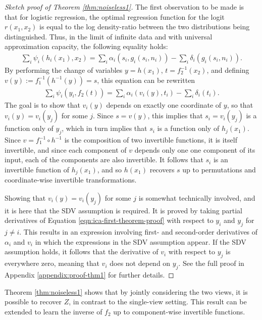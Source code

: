 \begin{proof}[Sketch proof of Theorem \ref{thm:noiseless1}]
The first observation to be made is that for logistic regression, the optimal regression function for the logit $r(x_1, x_2)$ is equal to the log density-ratio between the two distributions being distinguished.
Thus, in the limit of infinite data and with universal approximation capacity, the following equality holds:
%
\begin{align*}
\sum_{i}\psi_{i}(h_{i}({x}_{1}),{x}_{2}) = \sum_i \alpha_i(s_{i}, g_i(s_i, n_i)) - \sum_i \delta_i(g_i(s_i, n_i)).
\end{align*}
%
By performing the change of variables $y=h(x_1)$, $t=f_2^{-1}(x_2)$, and defining $v(y) := f_1^{-1}(h^{-1}(y)) = s$, this equation can be rewritten
%
\begin{align}
\sum_{i}\psi_{i}(y_i,f_2(t)) = \sum_i \alpha_i(v_i(y), t_i) - \sum_i \delta_i(t_i). \label{eqn:ica-first-theorem-proof}
\end{align}
%
The goal is to show that $v_i(y)$ depends on exactly one coordinate of $y$, so that $v_i(y) = v_i(y_j)$ for some $j$. 
Since $s = v(y)$, this implies that $s_i = v_i(y_j)$ is a function only of $y_j$, which in turn implies that $s_i$ is a function only of $h_j(x_1)$. 
Since $v = f_1^{-1} \circ h^{-1}$ is the composition of two invertible functions, it is itself invertible, and since each component of $v$ depends only one one component of its input, each of the components are also invertible.
It follows that $s_i$ is an invertible function of $h_j(x_1)$, and so $h(x_1)$ recovers $s$ up to permutations and coordinate-wise invertible transformations.

Showing that $v_i(y) = v_i(y_j)$ for some $j$ is somewhat technically involved, and it is here that the SDV assumption is required.
It is proved by taking partial derivatives of Equation \ref{eqn:ica-first-theorem-proof} with respect to $y_i$ and $y_j$ for $j\not=i$. 
This results in an expression involving first- and second-order derivatives of $\alpha_i$ and $v_i$ in which the expressions in the SDV assumption appear. 
If the SDV assumption holds, it follows that the derivative of $v_i$ with respect to $y_j$ is everywhere zero, meaning that $v_i$ does not depend on $y_j$. 
See the full proof in Appendix \ref{appendix:proof-thm1} for further details.
\end{proof}

Theorem \ref{thm:noiseless1} shows that by jointly considering the two views, it is possible to recover $Z$, in contrast to the single-view setting.
This result can be extended to learn the inverse of ${f}_2$ up to component-wise invertible functions.

